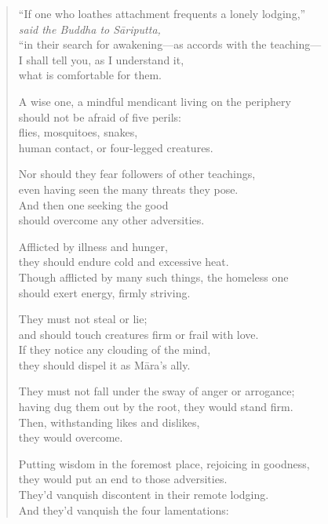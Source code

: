 \documentclass[12pt,openany]{book}%
\newcommand*{\scspeaker}[1]{\hspace{2em}\textit{#1}}
\begin{document}
\begin{verse}
“If one who loathes attachment frequents a lonely lodging,” \\
\scspeaker{said the Buddha to \textsanskrit{Sāriputta}, }\\
“in their search for awakening—as accords with the teaching—\\
I shall tell you, as I understand it, \\
what is comfortable for them. 

A wise one, a mindful mendicant living on the periphery \\
should not be afraid of five perils: \\
flies, mosquitoes, snakes, \\
human contact, or four-legged creatures. 

Nor should they fear followers of other teachings, \\
even having seen the many threats they pose. \\
And then one seeking the good \\
should overcome any other adversities. 

Afflicted by illness and hunger, \\
they should endure cold and excessive heat. \\
Though afflicted by many such things, the homeless one \\
should exert energy, firmly striving. 

They must not steal or lie; \\
and should touch creatures firm or frail with love. \\
If they notice any clouding of the mind, \\
they should dispel it as \textsanskrit{Māra}’s ally. 

They must not fall under the sway of anger or arrogance; \\
having dug them out by the root, they would stand firm. \\
Then, withstanding likes and dislikes, \\
they would overcome. 

Putting wisdom in the foremost place, rejoicing in goodness, \\
they would put an end to those adversities. \\
They’d vanquish discontent in their remote lodging. \\
And they’d vanquish the four lamentations: 


\end{verse}
\end{document}
